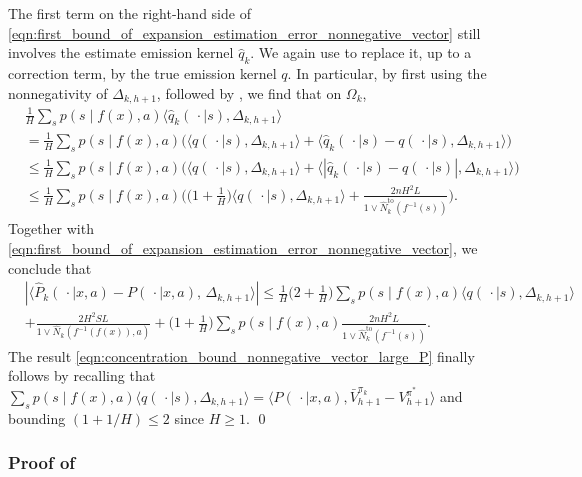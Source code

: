 \documentclass[11pt]{article}
\theoremstyle{definition}
\theoremstyle{definition}
\begin{document}
The first term on the right-hand side of \eqref{eqn:first_bound_of_expansion_estimation_error_nonnegative_vector} still involves the estimate emission kernel $\hat{q}_k$.
We again use  to replace it, up to a correction term, by the true emission kernel $q$.
In particular, by first using the nonnegativity of $\Delta_{k,h+1}$, followed by , we find that on $\Omega_k$,
\begin{equation}
	\begin{split}
		 &
		\frac{1}{H}
		\sum_{s}
		p(s\mid f(x),a)
		\langle \hat{q}_k(\,\cdot \mid s),\Delta_{k,h+1}\rangle
		\\
		 &
		=
		\frac{1}{H}
		\sum_{s}
		p(s\mid f(x),a)\bigl(
		\langle q(\,\cdot \mid s),\Delta_{k,h+1}\rangle
		+
		\langle \hat{q}_k(\,\cdot \mid s)-q(\,\cdot \mid s),\Delta_{k,h+1}\rangle
		\bigr)
		\\
		 &
		\leq
		\frac{1}{H}
		\sum_{s}
		p(s\mid f(x),a)\bigl(
		\langle q(\,\cdot \mid s),\Delta_{k,h+1}\rangle
		+
		\langle |\hat{q}_k(\,\cdot \mid s)-q(\,\cdot \mid s)|,\Delta_{k,h+1}\rangle
		\bigr)
		\\
		 &
		\leq
		\frac{1}{H}
		\sum_{s}
		p(s\mid f(x),a)\biggl(
		\biggl(1+\frac{1}{H}\biggr)\langle q(\,\cdot \mid s),\Delta_{k,h+1}\rangle
		+
		\frac{2n H^2L}{1\vee \hat{N}^{\mathrm{to}}_k(f^{-1}(s))}
		\biggr)
		.
	\end{split}
\end{equation}
Together with \eqref{eqn:first_bound_of_expansion_estimation_error_nonnegative_vector}, we conclude that
\begin{align}
	 &
	|\langle \hat{P}_k(\,\cdot \mid x,a)-P(\,\cdot \mid x,a),
	\, \Delta_{k,h+1}\rangle|
	\leq
	\frac{1}{H}
	\biggl(2+\frac{1}{H}\biggr)\sum_{s} p(s\mid f(x),a)\langle q(\,\cdot \mid s),\Delta_{k,h+1}\rangle
	\nonumber
	\\
	 &
	+
	\frac{2H^2SL}{1\vee \hat{N}_k(f^{-1}(f(x)),a)}
	+
	\biggl(1+\frac{1}{H}\biggr)\sum_{s} p(s\mid f(x),a)
	\frac{2n H^2L}{1\vee \hat{N}^{\mathrm{to}}_k(f^{-1}(s))}
	.
\end{align}
The result \eqref{eqn:concentration_bound_nonnegative_vector_large_P} finally follows by recalling that $\sum_{s} p(s\mid f(x),a)\langle q(\,\cdot \mid s),\Delta_{k,h+1}\rangle=\langle P(\,\cdot \mid x,a), \allowbreak \bar{V}^{\pi_k}_{h+1} - V^{\pi^*}_{h+1}\rangle$ and bounding $(1+1/H)\leq 2$ since $H\geq 1$.
\qed

\subsubsection{Proof of \texorpdfstring{}{lemma}}
\label{sec:proof_of_lem_concentration_bound_nonnegative_vector}
\end{document}
